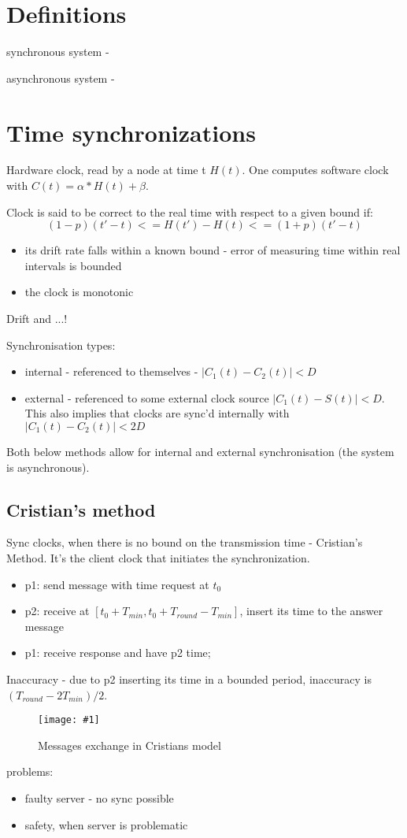 \documentclass[10pt,a4paper]{article}
\newcommand{\insImg}[2] { %
	\begin{figure}[ht!] %
		\centering %
		\texttt{[image: \#1]} %
		\caption{#2} %
		\label{overflow} %
	\end{figure} %
}
\begin{document}
\section{Definitions}
synchronous system - 

asynchronous system - 

\section{Time synchronizations}

Hardware clock, read by a node at time t $H(t)$. One computes software clock with $C(t) = \alpha * H(t) + \beta$.

Clock is said to be correct to the real time with respect to a given bound if:
\[(1-p)(t'-t) <= H(t')-H(t) <= (1+p)(t'-t)\]
\begin{itemize}
	\item its drift rate falls within a known bound - error of measuring time within real intervals is bounded
 	\item the clock is monotonic
\end{itemize}

Drift and ...!

Synchronisation types:
\begin{itemize}
	\item internal - referenced to themselves - $|C_1(t)-C_2(t)| < D$
	\item external - referenced to some external clock source $|C_1(t)-S(t)| < D$. This also implies that clocks are sync'd internally with $|C_1(t)-C_2(t)| < 2D$
\end{itemize}
Both below methods allow for internal and external synchronisation (the system is asynchronous).

\subsection{Cristian's method}
Sync clocks, when there is no bound on the transmission time - Cristian's Method. It's the client clock that initiates the synchronization.
\begin{itemize}
	\item p1: send message with time request at $t_0$
	\item p2: receive at $[t_0 + T_{min}, t_0 + T_{round} - T_{min}]$, insert its time to the answer message
	\item p1: receive response and have p2 time; 
\end{itemize}
Inaccuracy - due to p2 inserting its time in a bounded period, inaccuracy is $(T_{round} - 2T_{min})/2$.
\insImg{cristians}{Messages exchange in Cristians model}
problems:
\begin{itemize}
\item faulty server - no sync possible
\item safety, when server is problematic
\end{itemize}
\end{document}

